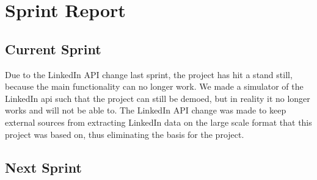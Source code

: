 \section{Sprint Report}

\subsection{Current Sprint}
Due to the LinkedIn API change last sprint, the project has hit a stand still, because the main functionality can no longer work. We made a simulator of the LinkedIn api such that the project can still be demoed, but in reality it no longer works and will not be able to. The LinkedIn API change was made to keep external sources from extracting LinkedIn data on the large scale format that this project was based on, thus eliminating the basis for the project.

\subsection{Next Sprint}

